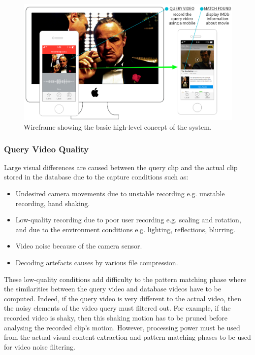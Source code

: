\begin{figure}[h]
\centerline{\includegraphics[width=1.15\textwidth]{figures/system_wireframe.png}}
\caption{\label{fig:wireframe}Wireframe showing the basic high-level concept of the system.}
\end{figure}

\subsubsection{Query Video Quality}

Large visual differences are caused between the query clip and the actual clip stored in the database due to the capture conditions \cite{liu2014mobilevideosearch} \cite{wang2016actionregonition} such as:
\begin{itemize}
    \item Undesired camera movements due to unstable recording e.g. unstable recording, hand shaking.
    \item Low-quality recording due to poor user recording e.g. scaling and rotation, and due to the environment conditions e.g. lighting, reflections, blurring.
    \item Video noise because of the camera sensor.
    \item Decoding artefacts causes by various file compression.
\end{itemize}

These low-quality conditions add difficulty to the pattern matching phase where the similarities between the query video and database videos have to be computed. Indeed, if the query video is very different to the actual video, then the noisy elements of the video query must filtered out. For example, if the recorded video is shaky, then this shaking motion has to be pruned before analysing the recorded clip's motion. However, processing power must be used from the actual visual content extraction and pattern matching phases to be used for video noise filtering.

